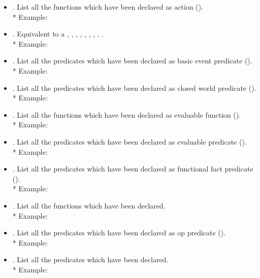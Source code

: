 \begin{itemize}

\item {}. List all the functions which have been declared as
action ().\\* 
Example: 

\item {}. Equivalent to a , ,
, , ,
, , , .\\*  
Example: 

\item {}. List all the predicates which have been declared as basic
event predicate ().\\*
Example: 

\item {}. List all the predicates which have been declared as
closed world predicate ().\\* 
Example: 

\item {}. List all the functions which have been declared as
evaluable function ().\\* 
Example: 

\item {}. List all the predicates which have been declared as
evaluable predicate ().\\* 
Example: 

\item {}. List all the predicates which have been declared as
functional fact predicate ().\\* 
Example: 

\item {}. List all the functions which have been declared.\\* 
Example: 

\item {}. List all the predicates which have been declared as
op predicate ().\\* 
Example: 

\item {}. List all the predicates which have been declared.\\* 
Example: 

\end{itemize}

